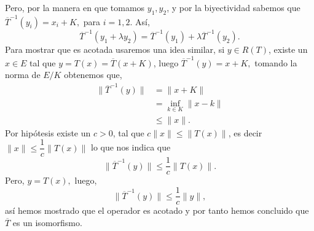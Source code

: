 \begin{itemize}
\begin{sproof}
          Pero, por la manera en que tomamos $y_1,y_2$, y por la biyectividad sabemos que $\overline{T}^{-1}(y_i)=x_i+K,$ para $i=1,2.$ Así,
          $$\overline{T}^{-1}(y_1+\lambda y_2)=\overline{T}^{-1}(y_1)+\lambda\overline{T}^{-1}(y_2).$$
          Para mostrar que es acotada usaremos una idea similar, si $y\in R(T)$, existe un $x\in E$ tal que $y=T(x)=\overline{T}(x+K)$, luego $\overline{T}^{-1}(y)=x+K,$ tomando la norma de $E/K$ obtenemos que,
          \begin{align*}
              \|\overline{T}^{-1}(y)\|&=\|x+K\|\\
              &=\inf_{k\in K}\|x-k\|\\
              &\leq \|x\|.
          \end{align*}
          Por hipótesis existe un $c>0$, tal que $c\|x\|\leq\|T(x)\|$, es decir $\|x\|\leq \dfrac{1}{c}\|T(x)\|$ lo que nos indica que
          $$\|\overline{T}^{-1}(y)\|\leq \dfrac{1}{c}\|T(x)\|.$$
          Pero, $y=T(x),$ luego,
          $$\|\overline{T}^{-1}(y)\|\leq \dfrac{1}{c}\|y\|,$$
          así hemos mostrado que el operador es acotado y por tanto hemos concluido que $\overline{T}$ es un isomorfismo.

    \end{sproof}
    
\end{itemize}